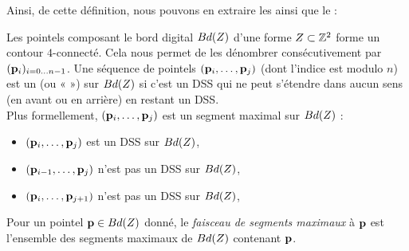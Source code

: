 Ainsi, de cette définition, nous pouvons en extraire les  ainsi que le  :
%
\begin{definition}{}
  \label{def:MDSS}
%
  Les pointels composant le bord digital $Bd({Z})$ d'une forme
  $Z \subset \mathbb{Z}^2$ forme un contour $4$-connecté. Cela nous permet de
  les dénombrer consécutivement par $(\mathbf{p}_i)_{i={0\ldots n-1}}$. Une séquence de
  pointels $(\mathbf{p}_i, \ldots, \mathbf{p}_j)$ (dont l'indice est modulo $n$) est un
   (ou «  ») sur $Bd({Z})$ si c'est
  un DSS qui ne peut s'étendre dans aucun sens (en avant ou en arrière) en
  restant un DSS.
  \\
  Plus formellement, $(\mathbf{p}_i, \ldots, \mathbf{p}_j)$ est un segment maximal sur $Bd({Z})$ \ssi :
  \begin{itemize}
    \item $(\mathbf{p}_i, \ldots, \mathbf{p}_j)$ est un DSS sur $Bd({Z})$,
    \item $(\mathbf{p}_{i-1}, \ldots, \mathbf{p}_j)$ n'est pas un DSS sur $Bd({Z})$,
    \item $(\mathbf{p}_i, \ldots, \mathbf{p}_{j+1})$ n'est pas un DSS sur $Bd({Z})$,
  \end{itemize}
  Pour un pointel $\mathbf{p} \in Bd({Z})$ donné, le \emph{faisceau de segments maximaux} à $\mathbf{p}$ est l'ensemble
  des segments maximaux de $Bd({Z})$ contenant $\mathbf{p}$.
%
\end{definition}


